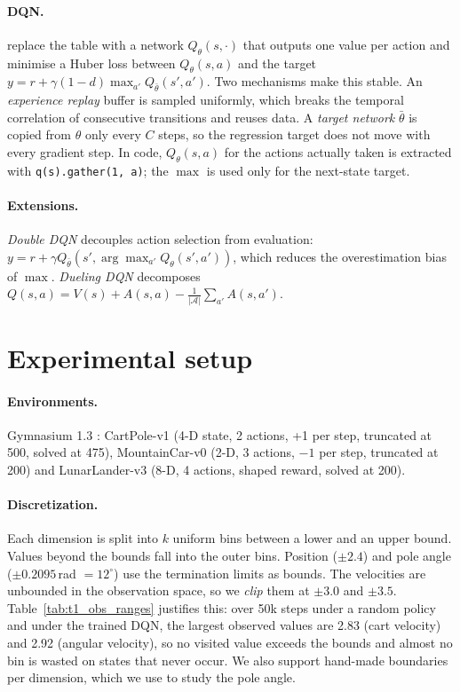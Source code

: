 \paragraph{DQN.} \citet{mnih2015} replace the table with a network $Q_\theta(s,\cdot)$ that outputs one
value per action and minimise a Huber loss between $Q_\theta(s,a)$ and the target
$y=r+\gamma(1-d)\max_{a'}Q_{\bar\theta}(s',a')$. Two mechanisms make this stable. An \emph{experience
replay} buffer is sampled uniformly, which breaks the temporal correlation of consecutive transitions and
reuses data. A \emph{target network} $\bar\theta$ is copied from $\theta$ only every $C$ steps, so the
regression target does not move with every gradient step. In code, $Q_\theta(s,a)$ for the actions
actually taken is extracted with \texttt{q(s).gather(1, a)}; the $\max$ is used only for the next-state target.

\paragraph{Extensions.} \emph{Double DQN} \citep{vanhasselt2016} decouples action selection from evaluation:
$y=r+\gamma Q_{\bar\theta}(s',\arg\max_{a'}Q_\theta(s',a'))$, which reduces the overestimation bias of $\max$.
\emph{Dueling DQN} \citep{wang2016} decomposes $Q(s,a)=V(s)+A(s,a)-\tfrac{1}{|\mathcal A|}\sum_{a'}A(s,a')$.

\section{Experimental setup}
\label{sec:setup}
\paragraph{Environments.} Gymnasium 1.3 \citep{towers2024gymnasium}: CartPole-v1 (4-D state,
2 actions, +1 per step, truncated at 500, solved at 475), MountainCar-v0 (2-D, 3 actions, $-1$ per step,
truncated at 200) and LunarLander-v3 (8-D, 4 actions, shaped reward, solved at 200).

\paragraph{Discretization.} Each dimension is split into $k$ uniform bins between a lower and an upper
bound. Values beyond the bounds fall into the outer bins. Position ($\pm2.4$) and pole angle
($\pm0.2095$\,rad $=12^\circ$) use the termination limits as bounds. The velocities are unbounded in the
observation space, so we \emph{clip} them at $\pm3.0$ and $\pm3.5$. Table~\ref{tab:t1_obs_ranges}
justifies this: over 50k steps under a random policy and under the trained DQN, the largest observed
values are 2.83 (cart velocity) and 2.92 (angular velocity), so no visited value exceeds the bounds and
almost no bin is wasted on states that never occur. We also support hand-made boundaries per dimension,
which we use to study the pole angle.

